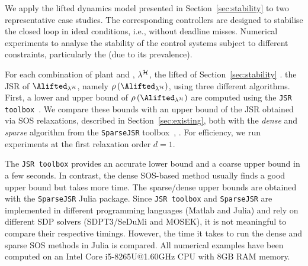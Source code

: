We  apply the lifted dynamics model presented in Section~\ref{sec:stability} to two representative case studies.
The corresponding controllers are designed to stabilise the closed loop in ideal conditions, i.e., without deadline misses.
Numerical experiments  to analyse the stability of the control systems subject to different constraints, particularly the  (due to its prevalence).
%
%

For each combination of plant and \ewhc{}, $\lambda^{\mathcal{H}}$, the lifted  of Section~\ref{sec:stability} .
%
 the JSR of $\Alifted_{\lambda^\strat}$, namely $\rho \left( \Alifted_{\lambda^\strat} \right)$, using three different algorithms.
First, a lower and upper bound of $\rho \left( \Alifted_{\lambda^\strat} \right)$ are computed using the \texttt{JSR toolbox}~\cite{vankeerberghen2014jsr}.
We compare these bounds with an upper bound of the JSR obtained via SOS relaxations, described in Section~\ref{sec:existing}, both with the \emph{dense} and \emph{sparse} algorithm from the \texttt{SparseJSR} toolbox~\cite{sparsejsr}, .
%
For efficiency, we run experiments at the first relaxation order $d = 1$.

The \texttt{JSR toolbox} provides an accurate lower bound and a coarse upper bound in a few seconds.
In contrast, the dense SOS-based method usually finds a good upper bound but takes more time.
The sparse/dense upper bounds are obtained with the \texttt{SparseJSR} Julia package.
Since \texttt{JSR toolbox} and \texttt{SparseJSR} are implemented in different programming languages (Matlab and Julia) and rely on different SDP solvers (SDPT3/SeDuMi and MOSEK), it is not meaningful to compare their respective timings.
However, the time it takes to run the dense and sparse SOS methods in Julia is compared.
All numerical examples have been computed on an Intel Core i5-8265U@1.60GHz CPU with 8GB RAM memory.

